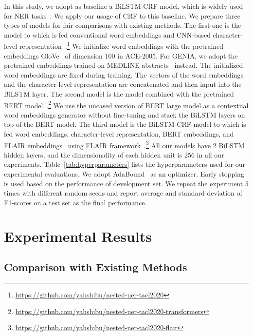 \documentclass[11pt,a4paper]{article}
\def\tabref#1{Table~\ref{#1}}
\begin{document}
In this study, we adopt as baseline a BiLSTM-CRF model, which is widely used for NER tasks~\cite{lample-etal-2016-neural,ma-hovy-2016-end,chiu-nichols-2016-named,reimers-gurevych-2017-reporting}.
We apply our usage of CRF to this baseline.
We prepare three types of models for fair comparisons with existing methods.
The first one is the model to which is fed conventional word embeddings and CNN-based character-level representation~\cite{ma-hovy-2016-end,chiu-nichols-2016-named,reimers-gurevych-2017-reporting}.\footnote{\url{https://github.com/yahshibu/nested-ner-tacl2020}}
We initialize word embeddings with the pretrained embeddings GloVe~\cite{pennington-etal-2014-glove} of dimension 100 in ACE-2005.
For GENIA, we adopt the pretrained embeddings trained on MEDLINE abstracts~\cite{chiu-etal-2016-train} instead.
The initialized word embeddings are fixed during training.
The vectors of the word embeddings and the character-level representation are concatenated and then input into the BiLSTM layer.
The second model is the model combined with the pretrained BERT model~\cite{devlin-etal-2019-bert}.\footnote{\url{https://github.com/yahshibu/nested-ner-tacl2020-transformers}}
We use the uncased version of BERT large model as a contextual word embeddings generator without fine-tuning and stack the BiLSTM layers on top of the BERT model.
The third model is the BiLSTM-CRF model to which is fed word embeddings, character-level representation, BERT embeddings, and FLAIR embeddings~\cite{akbik-etal-2018-contextual} using FLAIR framework~\cite{akbik-etal-2019-flair}.\footnote{\url{https://github.com/yahshibu/nested-ner-tacl2020-flair}}
All our models have 2 BiLSTM hidden layers, and the dimensionality of each hidden unit is 256 in all our experiments.
\tabref{tab:hyperparameters} lists the hyperparameters used for our experimental evaluations.
We adopt AdaBound~\cite{luo2019} as an optimizer.
Early stopping is used based on the performance of development set.
We repeat the experiment 5 times with different random seeds and report average and standard deviation of F1-scores on a test set as the final performance.

\section{Experimental Results}

\subsection{Comparison with Existing Methods}
\end{document}
